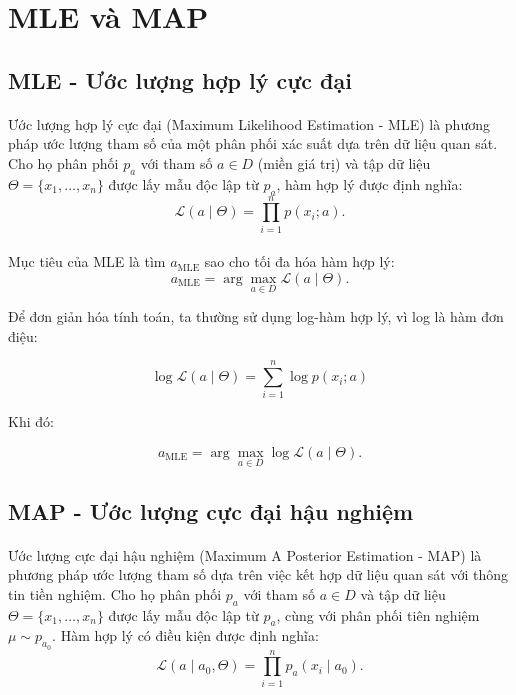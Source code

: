 \newpage
\section{MLE và MAP}

\subsection{MLE - Ước lượng hợp lý cực đại}

\paragraph{}{Ước lượng hợp lý cực đại (Maximum Likelihood Estimation - MLE) là phương pháp ước lượng tham số của một phân phối xác suất dựa trên dữ liệu quan sát. Cho họ phân phối $p_a$ với tham số $a \in D$ (miền giá trị) và tập dữ liệu $\Theta = \{x_1, \ldots, x_n\}$ được lấy mẫu độc lập từ $p_a$, hàm hợp lý được định nghĩa:
\[
\mathcal{L}(a \mid \Theta) = \prod_{i=1}^n p(x_i ; a).
\]
}

\paragraph{}{Mục tiêu của MLE là tìm $a_{\text{MLE}}$ sao cho tối đa hóa hàm hợp lý:
\[
a_{\text{MLE}} = \arg\max_{a \in D} \mathcal{L}(a \mid \Theta).
\]

Để đơn giản hóa tính toán, ta thường sử dụng log-hàm hợp lý, vì log là hàm đơn điệu:

\[
    \log \mathcal{L}(a \mid \Theta) = \sum_{i=1}^n \log p(x_i ; a)
\]

Khi đó:

\[
a_{\text{MLE}} = \arg\max_{a \in D} \log \mathcal{L}(a \mid \Theta).
\]

}

\subsection{MAP - Ước lượng cực đại hậu nghiệm}

\paragraph{}{Ước lượng cực đại hậu nghiệm (Maximum A Posterior Estimation - MAP) là phương pháp ước lượng tham số dựa trên việc kết hợp dữ liệu quan sát với thông tin tiền nghiệm. Cho họ phân phối $p_a$ với tham số $a \in D$ và tập dữ liệu $\Theta = \{x_1, \ldots, x_n\}$ được lấy mẫu độc lập từ $p_a$, cùng với phân phối tiên nghiệm $\mu \sim p_{a_0}$. Hàm hợp lý có điều kiện được định nghĩa:
\[
\mathcal{L}(a \mid a_0, \Theta) = \prod_{i=1}^n p_a(x_i \mid a_0).
\]
}

